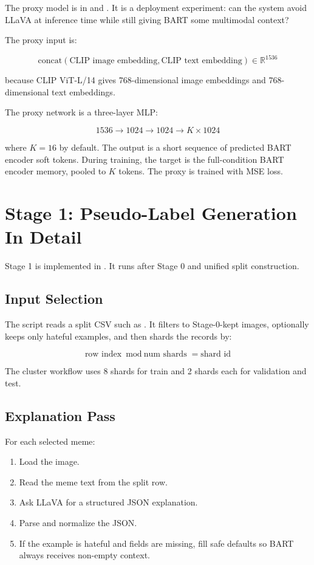 \documentclass[11pt,a4paper]{article}
\newcommand{\code}[1]{\texttt{\detokenize{#1}}}
\begin{document}
The proxy model is in  and . It is a deployment experiment: can the system avoid LLaVA at inference time while still giving BART some multimodal context?

The proxy input is:

\[
\text{concat}(\text{CLIP image embedding}, \text{CLIP text embedding}) \in \mathbb{R}^{1536}
\]

because CLIP ViT-L/14 gives 768-dimensional image embeddings and 768-dimensional text embeddings.

The proxy network is a three-layer MLP:

\[
1536 \rightarrow 1024 \rightarrow 1024 \rightarrow K \times 1024
\]

where \(K=16\) by default. The output is a short sequence of predicted BART encoder soft tokens. During training, the target is the full-condition BART encoder memory, pooled to \(K\) tokens. The proxy is trained with MSE loss.

\section{Stage 1: Pseudo-Label Generation In Detail}

Stage 1 is implemented in . It runs after Stage 0 and unified split construction.

\subsection{Input Selection}

The script reads a split CSV such as \code{unified_train.csv}. It filters to Stage-0-kept images, optionally keeps only hateful examples, and then shards the records by:

\[
\text{row index} \bmod \text{num shards} = \text{shard id}
\]

The cluster workflow uses 8 shards for train and 2 shards each for validation and test.

\subsection{Explanation Pass}

For each selected meme:

\begin{enumerate}
  \item Load the image.
  \item Read the meme text from the split row.
  \item Ask LLaVA for a structured JSON explanation.
  \item Parse and normalize the JSON.
  \item If the example is hateful and fields are missing, fill safe defaults so BART always receives non-empty context.
\end{enumerate}
\end{document}

